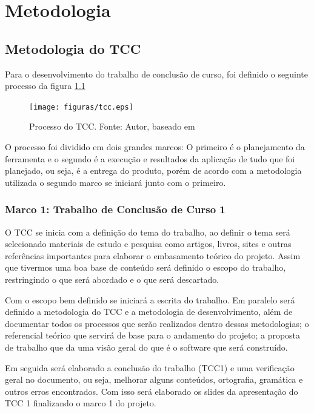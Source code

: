 \chapter{Metodologia}

\section{Metodologia do TCC}

Para o desenvolvimento do trabalho de conclusão de curso, foi definido o seguinte processo da figura \ref{fig:tcc}

\begin{figure}[h!]
	\centering
  \texttt{[image: figuras/tcc.eps]}
  \caption[Processo do TCC.]{Processo do TCC. Fonte: Autor, baseado em \cite{leonardo}}
	\label{fig:tcc}
\end{figure}


O processo foi dividido em dois grandes marcos: O primeiro é o planejamento da ferramenta e o segundo é a execução e resultados da aplicação de tudo que foi planejado, ou seja, é a entrega do produto, porém de acordo com a metodologia utilizada o segundo marco se iniciará junto com o primeiro.

\subsection{Marco 1: Trabalho de Conclusão de Curso 1}

O TCC se inicia com a definição do tema do trabalho, ao definir o tema será selecionado materiais de estudo e pesquisa como artigos, livros, sites e outras referências importantes para elaborar o embasamento teórico do projeto. Assim que tivermos uma boa base de conteúdo será definido o escopo do trabalho, restringindo o que será abordado e o que será descartado.

Com o escopo bem definido se iniciará a escrita do trabalho. Em paralelo será definido a metodologia do TCC e a metodologia de desenvolvimento, além de documentar todos os processos que serão realizados dentro dessas metodologias; o referencial teórico que servirá de base para o andamento do projeto; a proposta de trabalho que da uma visão geral do que é o software que será construído.

Em seguida será elaborado a conclusão do trabalho (TCC1) e uma verificação geral no documento, ou seja, melhorar alguns conteúdos, ortografia, gramática e outros erros encontrados. Com isso será elaborado os slides da apresentação do TCC 1 finalizando o marco 1 do projeto.

